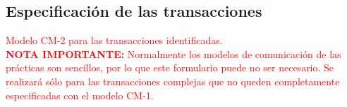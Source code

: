 \documentclass[12pt,a4paper,twoside,spanish]{article}      %
\begin{document}
\subsection{Especificación de las transacciones}

\textcolor {red} {
Modelo CM-2 para las transacciones identificadas.
\\
\textbf{NOTA IMPORTANTE:} Normalmente los modelos de comunicación de las prácticas son sencillos, por lo que este formulario puede no ser necesario. Se realizará sólo
para las transacciones complejas que no queden completamente
especificadas con el modelo CM-1.
}

\end{document}
